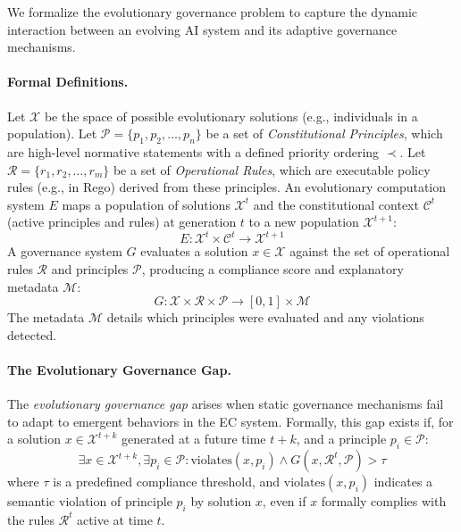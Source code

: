 \documentclass[manuscript,screen,review,anonymous,9pt]{acmart}
\begin{document}
We formalize the evolutionary governance problem to capture the dynamic interaction between an evolving AI system and its adaptive governance mechanisms.

\paragraph{Formal Definitions.} Let $\mathcal{X}$ be the space of possible evolutionary solutions (e.g., individuals in a population). Let $\mathcal{P} = \{p_1, p_2, \ldots, p_n\}$ be a set of \textit{Constitutional Principles}, which are high-level normative statements with a defined priority ordering $\prec$. Let $\mathcal{R} = \{r_1, r_2, \ldots, r_m\}$ be a set of \textit{Operational Rules}, which are executable policy rules (e.g., in Rego) derived from these principles. An evolutionary computation system $E$ maps a population of solutions $\mathcal{X}^t$ and the constitutional context $\mathcal{C}^t$ (active principles and rules) at generation $t$ to a new population $\mathcal{X}^{t+1}$:
\[E: \mathcal{X}^t \times \mathcal{C}^t \rightarrow \mathcal{X}^{t+1}\]
A governance system $G$ evaluates a solution $x \in \mathcal{X}$ against the set of operational rules $\mathcal{R}$ and principles $\mathcal{P}$, producing a compliance score and explanatory metadata $\mathcal{M}$:
\[G: \mathcal{X} \times \mathcal{R} \times \mathcal{P} \rightarrow [0,1] \times \mathcal{M}\]
The metadata $\mathcal{M}$ details which principles were evaluated and any violations detected.

\paragraph{The Evolutionary Governance Gap.} The \textit{evolutionary governance gap} arises when static governance mechanisms fail to adapt to emergent behaviors in the EC system. Formally, this gap exists if, for a solution $x \in \mathcal{X}^{t+k}$ generated at a future time $t+k$, and a principle $p_i \in \mathcal{P}$:
\[\exists x \in \mathcal{X}^{t+k}, \exists p_i \in \mathcal{P}: \text{violates}(x, p_i) \land G(x, \mathcal{R}^t, \mathcal{P}) > \tau\]
where $\tau$ is a predefined compliance threshold, and $\text{violates}(x, p_i)$ indicates a semantic violation of principle $p_i$ by solution $x$, even if $x$ formally complies with the rules $\mathcal{R}^t$ active at time $t$.
\end{document}
